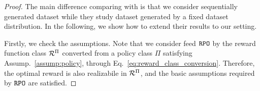 \begin{proof}
    The main difference comparing with \citep{liu2024provably} is that we consider sequentially generated dataset while they study dataset generated by a fixed dataset distribution.
    In the following, we show how to extend their results to our setting.

    Firstly, we check the assumptions. Note that we consider feed ${\texttt{RPO}}$ \citep{liu2024provably} by the reward function class $\mathcal{R}^{\Pi}$ converted from a policy class $\Pi$ satisfying Assump.~\ref{assump:policy}, through Eq.~\eqref{eq:reward_class_conversion}. 
    Therefore, the optimal reward is also realizabile in $\mathcal{R}^{\Pi}$, and the basic assumptions required by ${\texttt{RPO}}$ \citep{liu2024provably} are satisfied.



\end{proof}
